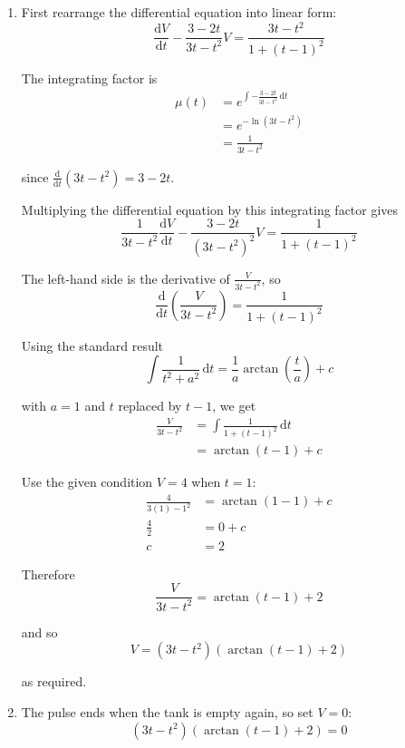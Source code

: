 \documentclass[leqno]{article}
\begin{document}
\begin{enumerate}[
  label=\textbf{\arabic*.},
  leftmargin=*,
  topsep=0pt,
  partopsep=0pt,
  parsep=0pt
]
\vspace*{10pt}

\begin{djsSolution}
\begin{enumerate}[label=\textbf{(\alph*)}]
  \item First rearrange the differential equation into linear form:
  \[
  \frac{\mathrm{d}V}{\mathrm{d}t}-\frac{3-2t}{3t-t^2}V=\frac{3t-t^2}{1+(t-1)^2}
  \]

  The integrating factor is
  \begin{align*}
  \mu(t)&=e^{\int -\frac{3-2t}{3t-t^2}\,\mathrm{d}t}\\
  &=e^{-\ln(3t-t^2)}\\
  &=\frac{1}{3t-t^2}
  \end{align*}

  since \(\frac{\mathrm{d}}{\mathrm{d}t}(3t-t^2)=3-2t\).

  Multiplying the differential equation by this integrating factor gives
  \[
  \frac{1}{3t-t^2}\frac{\mathrm{d}V}{\mathrm{d}t}-\frac{3-2t}{(3t-t^2)^2}V=\frac{1}{1+(t-1)^2}
  \]

  The left-hand side is the derivative of \(\frac{V}{3t-t^2}\), so
  \[
  \frac{\mathrm{d}}{\mathrm{d}t}\left(\frac{V}{3t-t^2}\right)=\frac{1}{1+(t-1)^2}
  \]

  Using the standard result
  \[
  \int \frac{1}{t^2+a^2}\,\mathrm{d}t=\frac{1}{a}\arctan\left(\frac{t}{a}\right)+c
  \]

  with \(a=1\) and \(t\) replaced by \(t-1\), we get
  \begin{align*}
  \frac{V}{3t-t^2}
  &= \int \frac{1}{1+(t-1)^2}\,\mathrm{d}t \\
  &= \arctan(t-1)+c
  \end{align*}

  Use the given condition \(V=4\) when \(t=1\):
  \begin{align*}
  \frac{4}{3(1)-1^2}&=\arctan(1-1)+c \\
  \frac{4}{2}&=0+c \\
  c&=2
  \end{align*}

  Therefore
  \[
  \frac{V}{3t-t^2}=\arctan(t-1)+2
  \]

  and so
  \[
  V=(3t-t^2)\left(\arctan(t-1)+2\right)
  \]

  as required.

  \item The pulse ends when the tank is empty again, so set \(V=0\):
  \[
  (3t-t^2)\left(\arctan(t-1)+2\right)=0
  \]


\end{enumerate}
\end{djsSolution}
\end{enumerate}
\end{document}
